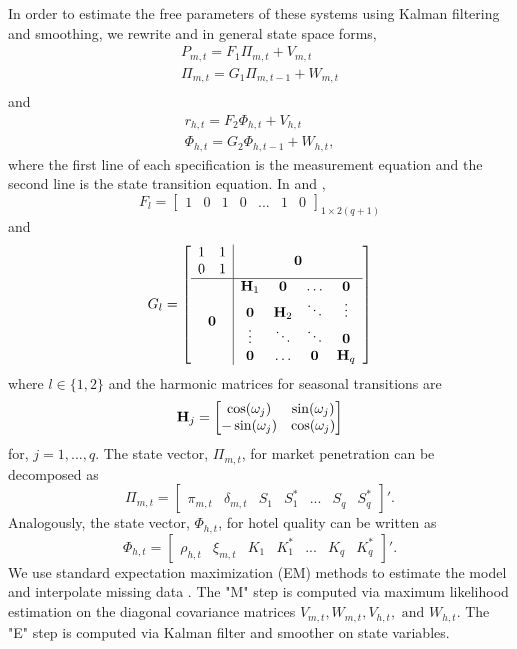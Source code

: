 \documentclass[mksc,blindrev]{informs3} %
\begin{document}
In order to estimate the free parameters of these systems using Kalman filtering and smoothing, we rewrite  and  in general state space forms,
\begin{equation}\label{eq:penetration_dlm_ssm}
\begin{split}
P_{m,t} = F_1\Pi_{m,t}+V_{m,t} \\
\Pi_{m,t} = G_1\Pi_{m,t-1}+W_{m,t} \\
\end{split}
\end{equation}
and
\begin{equation}\label{eq:ratings_dlm_ssm}
\begin{split}
r_{h,t} = F_2\Phi_{h,t}+V_{h,t} \\
\Phi_{h,t} = G_2\Phi_{h,t-1}+W_{h,t},
\end{split}
\end{equation}
where the first line of each specification is the measurement equation and the second line is the state transition equation. In  and , 
$$
F_l=\begin{bmatrix}
1 & 0 & 1 & 0 &...& 1 & 0
\end{bmatrix}_{1\times 2(q+1)}
$$ and 
$$
G_l=
\left[
\begin{array}{c|c}
\begin{matrix}
1&1\\		
0&1
\end{matrix}& \bold{0} \\
\hline
\bold{0} & \begin{matrix}
\bold{H}_1 & \bold{0} & \dots& \bold{0} \\
\bold{0} & \bold{H}_2 & \ddots & \vdots \\
\vdots &\ddots & \ddots & \bold{0} \\
\bold{0} &\dots & \bold{0} & \bold{H}_q
\end{matrix}
\end{array}
\right]
$$
where $l\in \{ 1, 2 \}$ and the harmonic matrices for seasonal transitions are
$$
\bold{H}_j=
\begin{bmatrix}
\cos(\omega_j) & \sin(\omega_j) \\
-\sin(\omega_j) & \cos(\omega_j)
\end{bmatrix}
$$
for, $j=1,...,q$. The state vector, $\Pi_{m,t}$, for market penetration can be decomposed as 
$$
\Pi_{m,t} = \begin{bmatrix}
\pi_{m, t} & \delta_{m,t} & S_1 & S_1^{*} & ... & S_q&S_q^{*}
\end{bmatrix}'.
$$
Analogously, the state vector, $\Phi_{h,t}$, for hotel quality can be written as
$$
\Phi_{h,t} = \begin{bmatrix}
\rho_{h, t} & \xi_{m,t} & K_1 & K_1^{*} & ... & K_q&K_q^{*}
\end{bmatrix}'.
$$
We use standard expectation maximization (EM) methods to estimate the model and interpolate missing data . The "M" step is computed via maximum likelihood estimation on the diagonal covariance matrices $V_{m,t}, W_{m,t}, V_{h,t}, \text{ and }W_{h,t}$. The "E" step is computed via Kalman filter and smoother on state variables.
\end{document}
